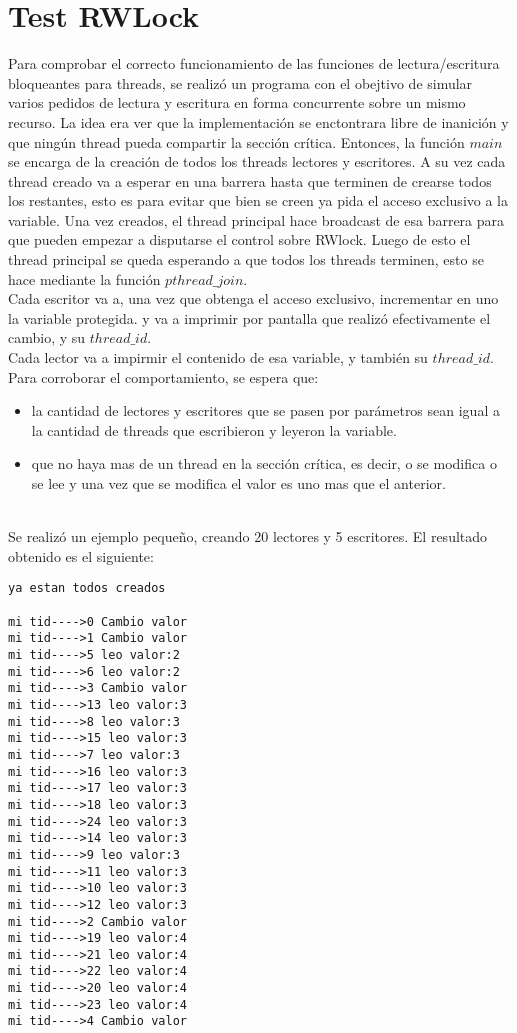 \section{Test RWLock}
Para comprobar el correcto funcionamiento de las funciones de lectura/escritura bloqueantes para threads, se realizó un programa con el
obejtivo de simular varios pedidos de lectura y escritura en forma concurrente sobre un mismo recurso.
La idea era ver que la implementación se enctontrara libre de inanición y que ningún thread pueda compartir la sección crítica.
Entonces, la función $main$ se encarga de la creación de todos los threads lectores y escritores. A su vez cada thread creado va a esperar en una barrera
hasta que terminen de crearse todos los restantes, esto es para evitar que bien se creen ya pida el acceso exclusivo a la variable.
Una vez creados, el thread principal hace broadcast de esa barrera para que pueden empezar a disputarse el control sobre RWlock. 
Luego de esto el thread principal se queda esperando a que todos los threads terminen, esto se hace mediante la función $pthread\_join$.
\\
Cada escritor va a, una vez que obtenga el acceso exclusivo, incrementar en uno la variable protegida. y va a imprimir por pantalla que realizó efectivamente
el cambio, y su $thread\_id$.
\\
Cada lector va a impirmir el contenido de esa variable, y también su $thread\_id$.
\\
Para corroborar el comportamiento, se espera que:
\begin{itemize}
\item{la cantidad de lectores y escritores que se pasen por parámetros sean igual a la cantidad de threads que escribieron y leyeron la variable.}
\item{que no haya mas de un thread en la sección crítica, es decir, o se modifica o se lee y una vez que se modifica el valor es uno mas que el anterior.}
\end{itemize}

\\
Se realizó un ejemplo pequeño, creando 20 lectores y 5 escritores. El resultado obtenido es el siguiente:

\begin{lstlisting}
ya estan todos creados

mi tid---->0 Cambio valor
mi tid---->1 Cambio valor
mi tid---->5 leo valor:2
mi tid---->6 leo valor:2
mi tid---->3 Cambio valor
mi tid---->13 leo valor:3
mi tid---->8 leo valor:3
mi tid---->15 leo valor:3
mi tid---->7 leo valor:3
mi tid---->16 leo valor:3
mi tid---->17 leo valor:3
mi tid---->18 leo valor:3
mi tid---->24 leo valor:3
mi tid---->14 leo valor:3
mi tid---->9 leo valor:3
mi tid---->11 leo valor:3
mi tid---->10 leo valor:3
mi tid---->12 leo valor:3
mi tid---->2 Cambio valor
mi tid---->19 leo valor:4
mi tid---->21 leo valor:4
mi tid---->22 leo valor:4
mi tid---->20 leo valor:4
mi tid---->23 leo valor:4
mi tid---->4 Cambio valor
\end{lstlisting}

